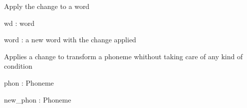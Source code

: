 \documentclass[letterpaper,10pt,english]{sphinxmanual}
\begin{document}
\begin{fulllineitems}
\begin{fulllineitems}
\label{\detokenize{index:Change.P_change.apply_word}}
\sphinxAtStartPar
Apply the change to a word

\sphinxAtStartPar
wd : word

\sphinxAtStartPar
word : a new word with the change applied

\end{fulllineitems}


\begin{fulllineitems}
\label{\detokenize{index:Change.P_change.just_transform}}
\sphinxAtStartPar
Applies a change to transform a phoneme whithout taking care of any kind of condition

\sphinxAtStartPar
phon : Phoneme

\sphinxAtStartPar
new\_phon : Phoneme

\end{fulllineitems}


\end{fulllineitems}

\end{document}
